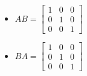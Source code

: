\documentclass{ximera}
\begin{document}
\begin{question}
\begin{problem}
\begin{solution}
\begin{itemize}
\item $AB =  \left[ \begin{array}{rrr} 1 & 0 & 0 \\ 0 & 1 & 0 \\ 0 & 0 & 1 \end{array} \right]$

\item $BA = \left[ \begin{array}{rrr} 1 & 0 & 0 \\ 0 & 1 & 0 \\ 0 & 0 & 1 \end{array} \right]$

\end{itemize}
\end{solution}
\end{problem}

\end{question}
\end{document}

